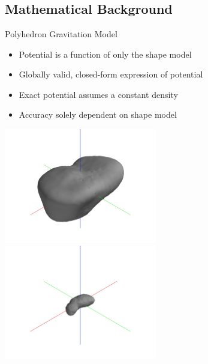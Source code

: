\documentclass[11pt,professionalfonts]{beamer}
\begin{document}
\section*{}
\subsection*{Mathematical Background}
\begin{frame}{Polyhedron Gravitation Model}

\begin{itemize}
    \item Potential is a function of only the shape model
    \item Globally valid, closed-form expression of potential
    \item Exact potential assumes a constant density 
    \item Accuracy solely dependent on shape model
\end{itemize}

\begin{center}
    \includegraphics[width=0.5\textwidth,keepaspectratio]{figures/castalia/partial_2047.jpg}~
    \includegraphics[width=0.5\textwidth,keepaspectratio]{figures/itokawa/partial_25349.jpg}
\end{center}
\end{frame}
\end{document}
